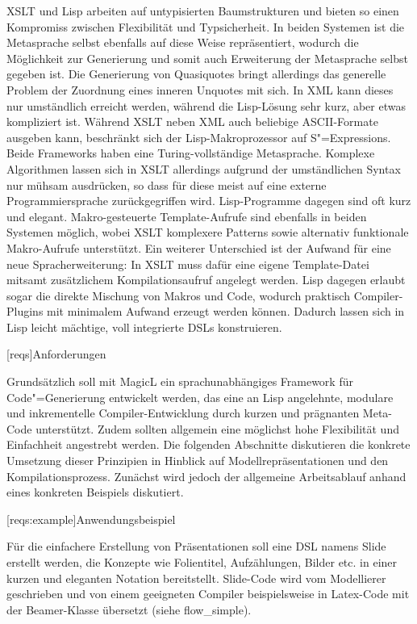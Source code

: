 \documentclass[11pt, a4paper, bibgerm]{scrbook}
\newcommand\lchapter{}
\newcommand\lsection{}
\newcommand\abb{}
\newcommand{\seea}[1]{(siehe \abb{#1})}
\newcommand{\sexps}{S"=Expressions}
\newcommand{\cgen}{Code"=Generierung}
\begin{document}
XSLT und Lisp arbeiten auf untypisierten Baumstrukturen und bieten so
einen Kompromiss zwischen Flexibilität und Typsicherheit. In beiden
Systemen ist die Metasprache selbst ebenfalls auf diese Weise
repräsentiert, wodurch die Möglichkeit zur Generierung und somit auch
Erweiterung der Metasprache selbst gegeben ist. Die Generierung von
Quasiquotes bringt allerdings das generelle Problem der Zuordnung eines
inneren Unquotes mit sich. In XML kann dieses nur umständlich erreicht
werden, während die Lisp-Lösung sehr kurz, aber etwas kompliziert
ist. Während XSLT neben XML auch beliebige ASCII-Formate ausgeben kann,
beschränkt sich der Lisp-Makroprozessor auf \sexps{}. Beide Frameworks
haben eine Turing-vollständige Metasprache. Komplexe Algorithmen lassen
sich in XSLT allerdings aufgrund der umständlichen Syntax nur mühsam
ausdrücken, so dass für diese meist auf eine externe Programmiersprache
zurückgegriffen wird. Lisp-Programme dagegen sind oft kurz und
elegant. Makro-gesteuerte Template-Aufrufe sind ebenfalls in beiden
Systemen möglich, wobei XSLT komplexere Patterns sowie alternativ
funktionale Makro-Aufrufe unterstützt. Ein weiterer Unterschied ist der
Aufwand für eine neue Spracherweiterung: In XSLT muss dafür eine eigene
Template-Datei mitsamt zusätzlichem Kompilationsaufruf angelegt
werden. Lisp dagegen erlaubt sogar die direkte Mischung von Makros und
Code, wodurch praktisch Compiler-Plugins mit minimalem Aufwand erzeugt
werden können. Dadurch lassen sich in Lisp leicht mächtige, voll
integrierte DSLs konstruieren.

\lchapter[reqs]{Anforderungen}

Grundsätzlich soll mit MagicL ein sprachunabhängiges Framework für
\cgen{} entwickelt werden, das eine an Lisp angelehnte, modulare und
inkrementelle Compiler-Entwicklung durch kurzen und prägnanten Meta-Code
unterstützt. Zudem sollten allgemein eine möglichst hohe Flexibilität
und Einfachheit angestrebt werden. Die folgenden Abschnitte diskutieren
die konkrete Umsetzung dieser Prinzipien in Hinblick auf
Modellrepräsentationen und den Kompilationsprozess. Zunächst wird jedoch
der allgemeine Arbeitsablauf anhand eines konkreten Beispiels
diskutiert.

\lsection[reqs:example]{Anwendungsbeispiel}

Für die einfachere Erstellung von Präsentationen soll eine DSL namens
Slide erstellt werden, die Konzepte wie Folientitel, Aufzählungen,
Bilder etc. in einer kurzen und eleganten Notation
bereitstellt. Slide-Code wird vom Modellierer geschrieben und von einem
geeigneten Compiler beispielsweise in Latex\cite{Latex}-Code mit der
Beamer\cite{LatexBeamer}-Klasse übersetzt \seea{flow_simple}.
\end{document}
